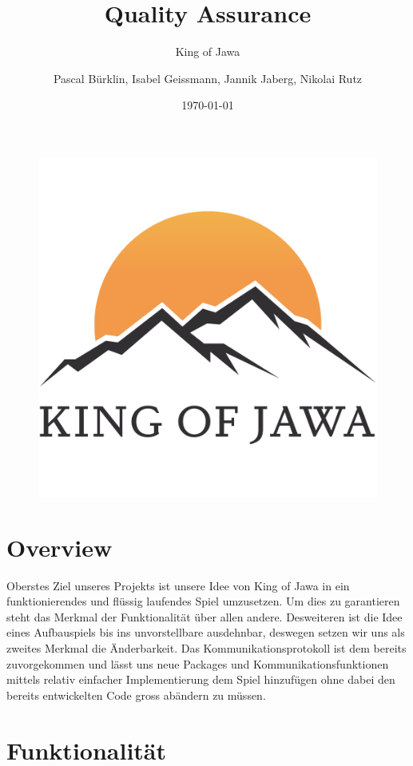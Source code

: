 \documentclass{scrartcl}
\title{Quality Assurance}
\subtitle{King of Jawa}
\author{Pascal Bürklin, Isabel Geissmann, Jannik Jaberg, Nikolai Rutz}
\date{\today}
\begin{document}
\maketitle
\begin{figure}[H]
	\includegraphics[width=\linewidth]{LOGO.png}
\end{figure}

\section{Overview}
Oberstes Ziel unseres Projekts ist unsere Idee von King of Jawa in ein funktionierendes und flüssig laufendes Spiel umzusetzen. Um dies zu garantieren steht das Merkmal der Funktionalität über allen andere.  Desweiteren ist die Idee eines Aufbauspiels bis ins unvorstellbare ausdehnbar, deswegen setzen wir uns als zweites Merkmal die Änderbarkeit. Das Kommunikationsprotokoll ist dem bereits zuvorgekommen und lässt uns neue Packages und Kommunikationsfunktionen mittels relativ einfacher Implementierung dem Spiel hinzufügen ohne dabei den bereits entwickelten Code gross abändern zu müssen. 

\section{Funktionalität}
\end{document}
